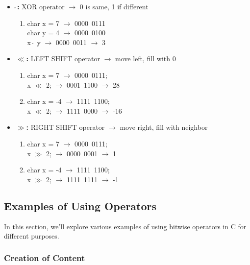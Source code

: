 \documentclass{article}
\begin{document}
\begin{itemize}
\begin{enumerate}
        \end{enumerate}
    \item \textbf{$\hat{~}$: }XOR operator $\rightarrow$ 0 is same, 1 if different
        \begin{enumerate}
            \item char x = 7 $\rightarrow$ 0000~0111\\
            char y = 4 $\rightarrow$ 0000~0100\\
            x $\hat{~}$ y $\rightarrow$ 0000~0011 $\rightarrow$ 3
        \end{enumerate}
    \item \textbf{$\ll$: }LEFT SHIFT operator $\rightarrow$ move left, fill with 0
        \begin{enumerate}
            \item char x = 7 $\rightarrow$ 0000~0111;\\
            x $\ll$ 2; $\rightarrow$ 0001~1100 $\rightarrow$ 28
            \item char x = -4 $\rightarrow$ 1111~1100;\\
            x $\ll$ 2; $\rightarrow$ 1111~0000 $\rightarrow$ -16
        \end{enumerate}
    \item \textbf{$\gg$: }RIGHT SHIFT operator $\rightarrow$ move right, fill with neighbor
        \begin{enumerate}
            \item char x = 7 $\rightarrow$ 0000~0111;\\
            x $\gg$ 2; $\rightarrow$ 0000~0001 $\rightarrow$ 1
            \item char x = -4 $\rightarrow$ 1111~1100;\\
            x $\gg$ 2; $\rightarrow$ 1111~1111 $\rightarrow$ -1
        \end{enumerate}
\end{itemize}

\subsection{Examples of Using Operators}

In this section, we'll explore various examples of using bitwise operators in C for different purposes.

\subsubsection{Creation of Content}
\end{document}
